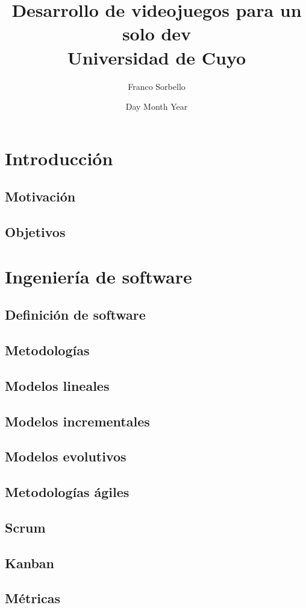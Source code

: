 \documentclass[12pt]{report}
\title{
    {Desarrollo de videojuegos para un solo dev}\\
    {\large Universidad de Cuyo}\\
}
\author{Franco Sorbello}
\date{Day Month Year}
\begin{document}
\maketitle
\tableofcontents
\chapter{Introducción}
\section{Motivación}

\section{Objetivos}


\chapter{Ingeniería de software}
\section{Definición de software}


\section{Metodologías} %


\section{Modelos lineales}


\section{Modelos incrementales}


\section{Modelos evolutivos}


\section{Metodologías ágiles}


\section{Scrum}


\section{Kanban}


\section{Métricas}


\printbibliography
\end{document}
